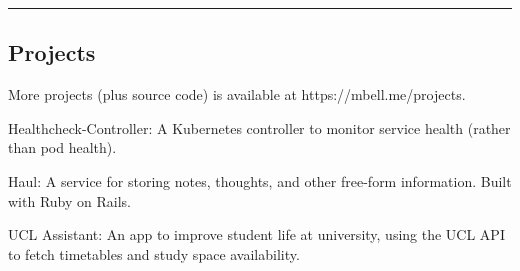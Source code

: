 \documentclass[11pt,a4paper]{article}
\newenvironment{indentsection}[1]%
{\begin{list}{}%
	{\setlength{\leftmargin}{#1}}%
	\item[]%
}
{\end{list}}
\begin{document}
\vspace{-0.4em}
\hrule

\vspace{-1.2em}
\subsection*{Projects}
\begin{indentsection}{\parindent}
	More projects (plus source code) is available at https://mbell.me/projects.
	\begin{description*}
		\item[Healthcheck-Controller:] A Kubernetes controller to monitor service health (rather than pod health).
		\item[Haul:] A service for storing notes, thoughts, and other free-form information. Built with Ruby on Rails.
		\item[UCL Assistant:] An app to improve student life at university, using the UCL API to fetch timetables and study space availability.
	\end{description*}
\end{indentsection}
\end{document}
